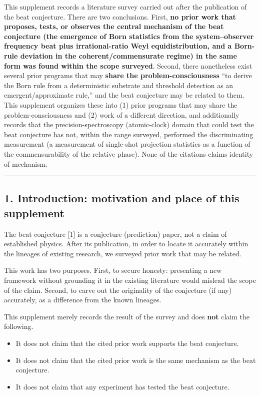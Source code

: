\documentclass[
]{ltjsarticle}
\providecommand{\tightlist}{%
  \setlength{\itemsep}{0pt}\setlength{\parskip}{0pt}}
\begin{document}
This supplement records a literature survey carried out after the
publication of the beat conjecture. There are two conclusions. First,
\textbf{no prior work that proposes, tests, or observes the central
mechanism of the beat conjecture (the emergence of Born statistics from
the system--observer frequency beat plus irrational-ratio Weyl
equidistribution, and a Born-rule deviation in the coherent/commensurate
regime) in the same form was found within the scope surveyed}. Second,
there nonetheless exist several prior programs that may \textbf{share
the problem-consciousness} ``to derive the Born rule from a
deterministic substrate and threshold detection as an
emergent/approximate rule,'' and the beat conjecture may be related to
them. This supplement organizes these into (1) prior programs that may
share the problem-consciousness and (2) work of a different direction,
and additionally records that the precision-spectroscopy (atomic-clock)
domain that could test the beat conjecture has not, within the range
surveyed, performed the discriminating measurement (a measurement of
single-shot projection statistics as a function of the commensurability
of the relative phase). None of the citations claims identity of
mechanism.

\begin{center}\rule{0.5\linewidth}{0.5pt}\end{center}

\subsection{1. Introduction: motivation and place of this
supplement}\label{introduction-motivation-and-place-of-this-supplement}

The beat conjecture {[}1{]} is a conjecture (prediction) paper, not a
claim of established physics. After its publication, in order to locate
it accurately within the lineages of existing research, we surveyed
prior work that may be related.

This work has two purposes. First, to secure honesty: presenting a new
framework without grounding it in the existing literature would mislead
the scope of the claim. Second, to carve out the originality of the
conjecture (if any) accurately, as a difference from the known lineages.

This supplement merely records the result of the survey and does
\textbf{not} claim the following.

\begin{itemize}
\tightlist
\item
  It does not claim that the cited prior work supports the beat
  conjecture.
\item
  It does not claim that the cited prior work is the same mechanism as
  the beat conjecture.
\item
  It does not claim that any experiment has tested the beat conjecture.
\end{itemize}
\end{document}
